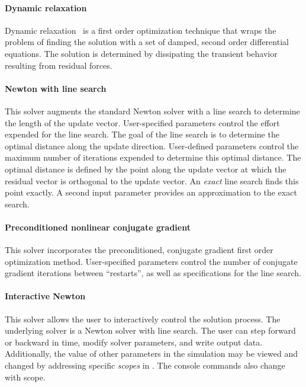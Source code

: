 \paragraph{Dynamic relaxation}
Dynamic relaxation~\cite{Underwood1983} 
is a first order optimization technique that
wraps the problem of finding the solution with a set of damped, second
order differential equations.  The solution is determined by dissipating
the transient behavior resulting from residual forces.

\paragraph{Newton with line search}
This solver augments the standard Newton solver with a line search to
determine the length of the update vector.  User-specified parameters
control the effort expended for the line search. The goal of the line 
search is to determine the optimal distance along the update direction.
User-defined parameters control the maximum number of iterations
expended to determine this optimal distance. The optimal distance is
defined by the point along the update vector at which the residual 
vector is orthogonal to the update vector. An \textit{exact} line
search finds this point exactly. A second input parameter provides
an approximation to the exact search.

\paragraph{Preconditioned nonlinear conjugate gradient}
This solver incorporates the preconditioned, conjugate gradient 
first order optimization method. User-specified parameters control the 
number of conjugate gradient iterations between ``restarts'', as well 
as specifications for the line search.

\paragraph{Interactive Newton}
This solver allows the user to interactively control the solution 
process. The underlying solver is a Newton solver with line search. 
The user can step forward or backward in time, modify solver parameters,
and write output data. Additionally, the value of other parameters in 
the simulation may be viewed and changed by addressing specific 
\textit{scopes} in \tahoe. The console commands also change with scope.
